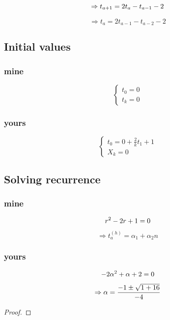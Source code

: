 \documentclass[]{book}
\theoremstyle{definition}
\begin{document}
$$
\Rightarrow t_{a+1} = 2t_{a} - t_{a-1} - 2 \newline
$$

$$
\Rightarrow t_{a} = 2t_{a-1} - t_{a-2} - 2
$$
	
\subsection*{Initial values}
\subsubsection*{mine}
$$
\begin{cases}
  t_{0} = 0 \\
  t_{k} = 0
\end{cases}
$$

\subsubsection*{yours}
$$
\begin{cases}
  t_{0} = 0 + \frac{2}{k}t_{1} + 1 \\
  X_{k} = 0
\end{cases}
$$

\subsection*{Solving recurrence}
\subsubsection*{mine}
$$
r^2 -2r + 1 = 0 \newline
$$
$$
\Rightarrow t^{(h)}_{a} = \alpha_{1} + \alpha_{2}n
$$

\subsubsection*{yours}
$$
-2\alpha^2 + \alpha + 2 = 0 \newline
$$
$$
\Rightarrow \alpha = \frac{-1\pm \sqrt{1+16}}{-4} \newline
$$



\begin{proof}
\end{proof}
\end{document}
